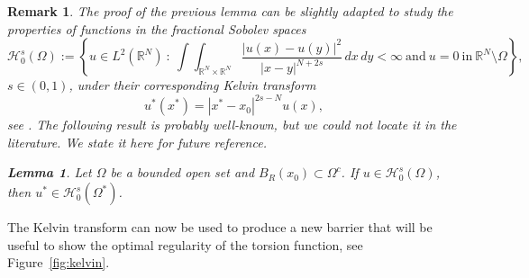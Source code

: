\documentclass[11pt]{article}
\newcommand{\R}{\mathbb{R}}
\numberwithin{equation}{section}
\newtheorem{lemma}[theorem]{Lemma}
\newtheorem{remark}[theorem]{Remark}
\begin{document}
\begin{remark}
The proof of the previous lemma can be slightly adapted to study the properties of functions in the fractional Sobolev spaces
\begin{equation*}
{\mathcal H}_0^s(\Omega):=\left\lbrace u\in L^{2}(\mathbb{R}^{N})~:~\int\int_{\R^N \times \R^N}\frac{|u(x)-u(y)|^2}{|x-y|^{N+2s}}\, dx\, dy<\infty~\mbox{and}~u=0~\mbox{in}~\mathbb{R}^{N}\setminus\Omega\right\rbrace,
\end{equation*}
$s \in (0,1)$, under their corresponding Kelvin transform
\begin{equation*}
    u^*(x^*) = |x^*-x_0|^{2s-N} u(x),
\end{equation*}
see \cite{RS14}. The following result is probably well-known, but we could not locate it in the literature.  We state it here for future reference. 

\begin{lemma}
    Let $\Omega$ be a bounded open set and $B_R(x_0) \subset \Omega^c$. If $u \in {\mathcal H}_0^s(\Omega)$, then $u^* \in {\mathcal H}_0^s(\Omega^*)$. 
\end{lemma}
\end{remark}

The Kelvin transform can now be used to produce a new barrier that will be useful to show the optimal regularity of the torsion function, see Figure~\ref{fig:kelvin}.
\end{document}
